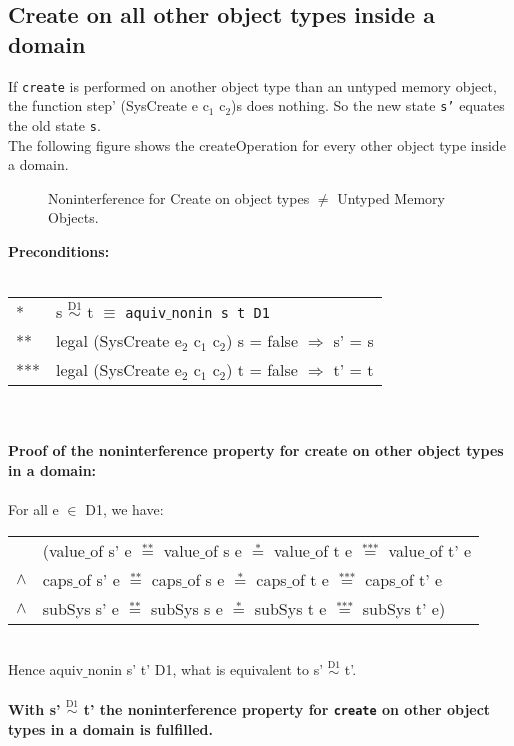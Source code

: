 \subsection{Create on all other object types inside a domain}
If \texttt{create} is performed on another object type than an untyped memory object, the  function step' (SysCreate e c$_1$ c$_2$)s does nothing. So the new state \texttt{s'} equates the old state \texttt{s}. \\
The following figure shows the createOperation for every other object type inside a domain.\\
\begin{figure}[H]
\caption{Noninterference for Create on object types $\neq$ Untyped Memory Objects.}
\end{figure} 
\textbf{Preconditions:} \\ \\
\begin{tabular}{ll}
* & s $\overset{\text{D1}}{\sim}$ t $\equiv$ \texttt{aquiv$\_$nonin s t D1}	\\ 
** & legal (SysCreate e$_2$ c$_1$ c$_2$) s = false $\Rightarrow$ s' = s \\ 
*** & legal (SysCreate e$_2$ c$_1$ c$_2$) t = false $\Rightarrow$ t' = t
\end{tabular}\\ \\  
\textbf{Proof of the noninterference property for create on other object types in a domain:} \\ \\
For all e $\in$ D1, we have: \\ 
\begin{tabular}{ll}
& (value$\_$of s' e $\overset{\text{**}}{=}$ value$\_$of s e $\overset{\text{*}}{=}$ value$\_$of t e $\overset{\text{***}}{=}$ value$\_$of t' e \\
$\wedge$ & caps$\_$of s' e $\overset{\text{**}}{=}$ caps$\_$of s e $\overset{\text{*}}{=}$ caps$\_$of t e $\overset{\text{***}}{=}$ caps$\_$of t' e \\
$\wedge$ & subSys s' e $\overset{\text{**}}{=}$ subSys s e $\overset{\text{*}}{=}$ subSys t e $\overset{\text{***}}{=}$ subSys t' e)
\end{tabular} \\
Hence aquiv$\_$nonin s' t' D1, what is equivalent to s' $\overset{\text{D1}}{\sim}$ t'. \\ \\ 
\textbf{With s' $\overset{\text{D1}}{\sim}$ t' the noninterference property for \texttt{create} on other object types in a domain is fulfilled.} 
